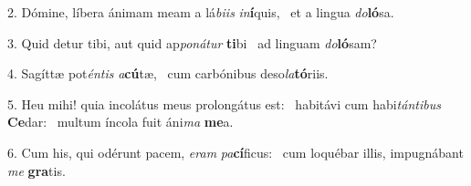 2. Dómine, líbera ánimam meam a lá\textit{bi}\textit{is} \textit{in}\textbf{í}quis, \ast\  et a lingua \textit{do}\textbf{ló}sa.\

3. Quid detur tibi, aut quid ap\textit{po}\textit{ná}\textit{tur} \textbf{ti}bi \ast\  ad linguam \textit{do}\textbf{ló}sam?\

4. Sagíttæ pot\textit{én}\textit{tis} \textit{a}\textbf{cú}tæ, \ast\  cum carbónibus deso\textit{la}\textbf{tó}riis.\

5. Heu mihi! quia incolátus meus prolongátus est: \dag\  habitávi cum habi\textit{tán}\textit{ti}\textit{bus} \textbf{Ce}dar: \ast\  multum íncola fuit áni\textit{ma} \textbf{me}a.\

6. Cum his, qui odérunt pacem, \textit{e}\textit{ram} \textit{pa}\textbf{cí}ficus: \ast\  cum loquébar illis, impugnábant \textit{me} \textbf{gra}tis.\

